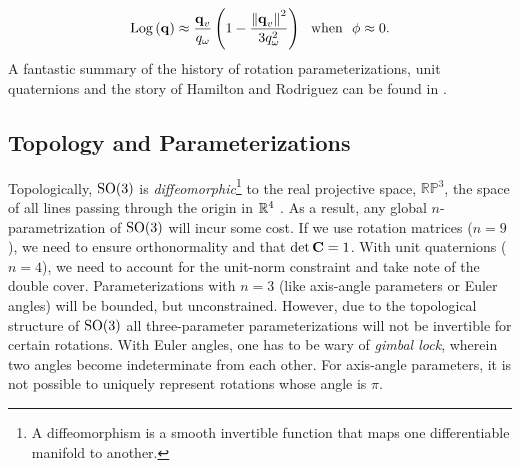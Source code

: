 \begin{equation}
	\mathrm{Log}\left({\boldsymbol{\mathbf{q}}}\right) \approx \frac{\boldsymbol{\mathbf{q}}_v}{q_\omega} \left( 1 - \frac{\left\Vert\boldsymbol{\mathbf{q}}_v\right\Vert^2}{3 q_\omega^2}\right) ~~ \textrm{when} ~~ \phi \approx 0. 
\end{equation}
A fantastic summary of the history of rotation parameterizations, unit quaternions and the story of Hamilton and Rodriguez can be found in \cite{Altmann1989-ru}.

\subsection{Topology and Parameterizations}
Topologically, $\mathrm{SO}(3)$ is \textit{diffeomorphic}\footnote{A diffeomorphism is a smooth invertible function that maps one differentiable manifold to another.} to the real projective space, $\mathbb{RP}^3$, the space of all lines passing through the origin in $\RealNumbers^4$ \citep{Hartley2013-rc}. As a result, any global $n$-parametrization of $\mathrm{SO}(3)$ will incur some cost. If we use rotation matrices ($n = 9$), we need to ensure orthonormality and that $\det \boldsymbol{\mathbf{C}} = 1$. With unit quaternions ($n = 4$), we need to account for the unit-norm constraint and take note of the double cover. Parameterizations with $n=3$ (like axis-angle parameters or Euler angles) will be bounded, but unconstrained. However, due to the topological structure of $\mathrm{SO}(3)$ all three-parameter parameterizations will not be invertible for certain rotations. With Euler angles, one has to be wary of \textit{gimbal lock}, wherein two angles become indeterminate from each other. For axis-angle parameters, it is not possible to uniquely represent rotations whose angle is $\pi$. 
 
